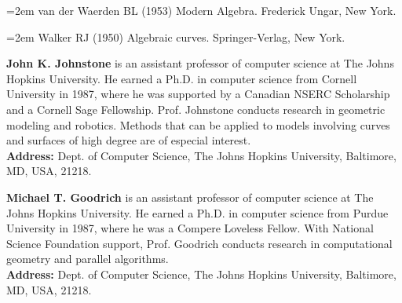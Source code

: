 \hangindent=2em  %
\noindent 
van der Waerden BL (1953) Modern Algebra.
Frederick Ungar, New York.

\hangindent=2em  %
\noindent 
Walker RJ (1950) Algebraic curves.
Springer-Verlag, New York.

\vspace{5ex}

\hangindent=2in
\noindent
{\bf John K. Johnstone} is an assistant professor of computer science at The Johns Hopkins
University.  
He earned a Ph.D. in computer science from Cornell University in 1987, where he was supported by
a Canadian NSERC Scholarship and a Cornell Sage Fellowship.
Prof. Johnstone conducts research in geometric modeling and robotics.
Methods that can be applied to models involving curves and surfaces of
high degree are of especial interest.\\
{\bf Address:} Dept. of Computer Science, The Johns Hopkins University, Baltimore, MD,
USA, 21218.

\vspace{10ex}

\noindent
{\bf Michael T. Goodrich} is an assistant professor of computer science at 
The Johns Hopkins University.   
He earned a Ph.D. in computer science from Purdue University in 1987, where he was a Compere
Loveless Fellow.  
With National Science Foundation support, Prof. Goodrich conducts research in computational
geometry and parallel algorithms.\\
{\bf Address:} Dept. of Computer Science, The Johns Hopkins University, Baltimore, MD,
USA, 21218.


